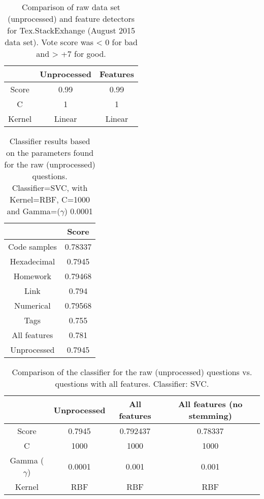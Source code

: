 \begin{table}[!h]%
	\centering
	\begin{tabular}{| c | c | c |}
		\hline
		~ 			& Unprocessed		& Features	\\ \hline
		Score 		& 0.99				& 0.99		\\ \hline
		C			& 1					& 1			\\ \hline
		Kernel		& Linear			& Linear	\\ \hline
	\end{tabular}
	\caption{Comparison of raw data set (unprocessed) and feature detectors for Tex.StackExhange (August 2015 data set). Vote score was < 0 for bad and > +7 for good.}
	\label{tab:singular_feature_detector_tex}
\end{table}


\begin{table}[!h]%
	\centering
	\begin{tabular}{| c | c |}
		\hline
		~ 				& Score			\\ \hline
		Code samples 	& 0.78337		\\ \hline
		Hexadecimal		& 0.7945		\\ \hline
		Homework 		& 0.79468		\\ \hline
		Link			& 0.794			\\ \hline				
		Numerical		& 0.79568		\\ \hline
		Tags			& 0.755			\\ \hline
		All features	& 0.781			\\ \hline
		Unprocessed		& 0.7945		\\ \hline
	\end{tabular}
	\caption{Classifier results based on the parameters found for the raw (unprocessed) questions. Classifier=SVC, with Kernel=RBF, C=1000 and Gamma=($\gamma$) 0.0001}	
	\label{tab:singular_feature_detector_so}
\end{table}

\begin{table}[!h]%
	\centering
	\begin{tabular}{| c | c | c | c |}
		\hline
		~ 					& Unprocessed		& All features		& All features (no stemming)	\\ \hline
		Score 				& 0.7945			& 0.792437			& 0.78337						\\ \hline
		C					& 1000				& 1000				& 1000							\\ \hline
		Gamma ($\gamma$)	& 0.0001			& 0.001				& 0.001							\\ \hline
		Kernel				& RBF				& RBF				& RBF							\\ \hline
	\end{tabular}
	\caption{Comparison of the classifier for the raw (unprocessed) questions vs. questions with all features. Classifier: SVC.}
	\label{tab:unprocessed_vs_all_feature_detectors_svc_so}
\end{table}

